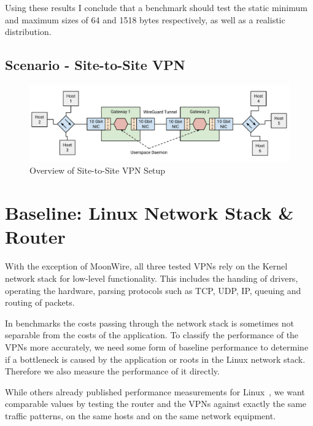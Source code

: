 \documentclass[IN,11pt,twoside,openright,master,english]{tumthesis}
\begin{document}
Using these results I conclude that a benchmark should test the static minimum and maximum sizes of 64 and 1518 bytes respectively, as well as a realistic distribution.
 


\subsection{Scenario - Site-to-Site VPN}
\begin{figure}[h]
	\centering
	\includegraphics[width=1\linewidth]{figures/PoC-Overview}
	\caption{Overview of Site-to-Site VPN Setup}
	\label{fig:poc-overview}
\end{figure}


\section{Baseline: Linux  Network Stack \& Router}
With the exception of MoonWire, all three tested VPNs rely on the Kernel network stack for low-level functionality. This includes the handing of drivers, operating the hardware, parsing protocols such as TCP, UDP, IP, queuing and routing of packets.

In benchmarks the costs passing through the network stack is sometimes not separable from the costs of the application.
To classify the performance of the VPNs more accurately, we need some form of baseline performance to determine if a bottleneck is caused by the application or roots in the Linux network stack. Therefore we also measure the performance of it directly.

While others already published performance measurements for Linux~\cite{}, we want comparable values by testing the router and the VPNs against exactly the same traffic patterns, on the same hosts and on the same network equipment. 
\end{document}
